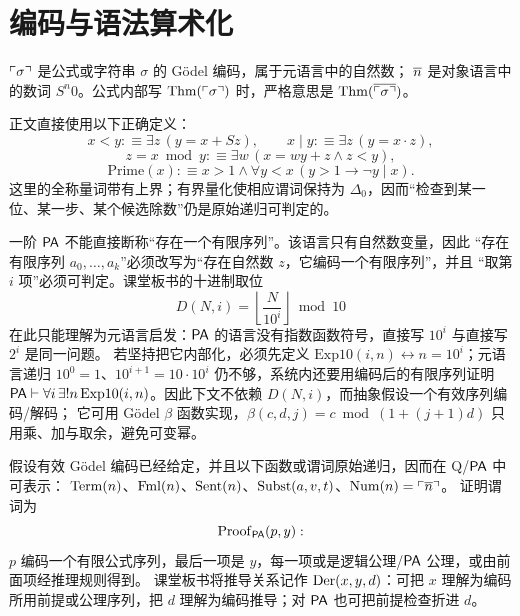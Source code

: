 \section{编码与语法算术化}\label{sec:coding}

\begin{definition}[三层记号]\label{def:three-layers}
\(\ulcorner \sigma\urcorner\) 是公式或字符串 \(\sigma\) 的 Gödel 编码，属于元语言中的自然数；
\(\overline{n}\) 是对象语言中的数词 \(S^{n}0\)。公式内部写 \(\mathrm{Thm}(\ulcorner \sigma\urcorner)\) 时，严格意思是
\(\mathrm{Thm}(\overline{\ulcorner \sigma\urcorner})\)。
\end{definition}

\begin{definition}[常用算术缩写]\label{def:arith-abbrev}
正文直接使用以下正确定义：
\[
x<y:\equiv \exists z\,(y=x+Sz),\qquad
x\mid y:\equiv \exists z\,(y=x\cdot z),
\]
\[
z=x\bmod y:\equiv \exists w\,(x=wy+z\wedge z<y),
\]
\[
\mathrm{Prime}(x):\equiv x>1\wedge \forall y<x\,(y>1\to \neg y\mid x).
\]
这里的全称量词带有上界；有界量化使相应谓词保持为 \(\Delta_0\)，因而“检查到某一位、某一步、某个候选除数”仍是原始递归可判定的。
\end{definition}

\begin{remark}\label{rem:finite-sequence}
一阶 \(\mathsf{PA}\) 不能直接断称“存在一个有限序列”。该语言只有自然数变量，因此
“存在有限序列 \(a_0,\dots,a_k\)”必须改写为“存在自然数 \(z\)，它编码一个有限序列”，并且
“取第 \(i\) 项”必须可判定。课堂板书的十进制取位
\[
D(N,i)=\left\lfloor \frac{N}{10^{i}}\right\rfloor \bmod 10
\]
在此只能理解为元语言启发：\(\mathsf{PA}\) 的语言没有指数函数符号，直接写 \(10^{i}\) 与直接写 \(2^{i}\) 是同一问题。
若坚持把它内部化，必须先定义 \(\mathrm{Exp10}(i,n)\leftrightarrow n=10^{i}\)；元语言递归
\(10^{0}=1\)、\(10^{i+1}=10\cdot10^{i}\) 仍不够，系统内还要用编码后的有限序列证明
\(\mathsf{PA}\vdash\forall i\,\exists!n\,\mathrm{Exp10}(i,n)\)。因此下文不依赖 \(D(N,i)\)，而抽象假设一个有效序列编码/解码；
它可用 Gödel \(\beta\) 函数实现，\(\beta(c,d,j)=c\bmod(1+(j+1)d)\) 只用乘、加与取余，避免可变幂。
\end{remark}

\begin{definition}[语法谓词与证明谓词]\label{def:syntax-predicates}
假设有效 Gödel 编码已经给定，并且以下函数或谓词原始递归，因而在 Q/\(\mathsf{PA}\) 中可表示：
\(\mathrm{Term}(n)\)、\(\mathrm{Fml}(n)\)、\(\mathrm{Sent}(n)\)、\(\mathrm{Subst}(a,v,t)\)、\(\mathrm{Num}(n)=\ulcorner \overline{n}\urcorner\)。
证明谓词为
\[
\mathrm{Proof}_{\mathsf{PA}}(p,y):
\]
\(p\) 编码一个有限公式序列，最后一项是 \(y\)，每一项或是逻辑公理/\(\mathsf{PA}\) 公理，或由前面项经推理规则得到。
课堂板书将推导关系记作 \(\mathrm{Der}(x,y,d)\)：可把 \(x\) 理解为编码所用前提或公理序列，把 \(d\) 理解为编码推导；对 \(\mathsf{PA}\) 也可把前提检查折进 \(d\)。
\end{definition}

